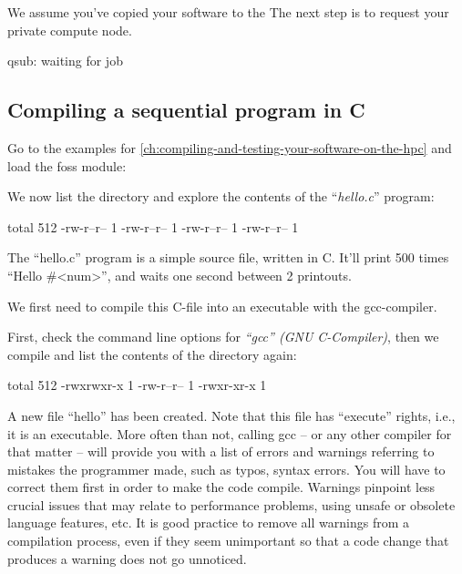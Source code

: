 We assume you've copied your software to the \hpc The next step is to request your private compute node.

\begin{prompt}
qsub: waiting for job %
\end{prompt}

\subsection{Compiling a sequential program in C}

Go to the examples for
\autoref{ch:compiling-and-testing-your-software-on-the-hpc} and load the foss
module:

\begin{prompt}
\end{prompt}

We now list the directory and explore the contents of the ``\emph{hello.c}''
program:

\begin{prompt}
total 512
-rw-r--r-- 1 %
-rw-r--r-- 1 %
-rw-r--r-- 1 %
-rw-r--r-- 1 %
\end{prompt}


The ``hello.c'' program is a simple source file, written in C. It'll print 500
times ``Hello \#<{}num>{}'', and waits one second between 2 printouts.

We first need to compile this C-file into an executable with the gcc-compiler.

First, check the command line options for \emph{``gcc'' (GNU C-Compiler)},
then we compile and list the contents of the directory again:

\begin{prompt}
total 512
-rwxrwxr-x 1 %
-rw-r--r-- 1 %
-rwxr-xr-x 1 %
\end{prompt}

A new file ``hello'' has been created. Note that this file has ``execute''
rights, i.e., it is an executable. More often than not, calling gcc -- or any
other compiler for that matter -- will provide you with a list of errors and
warnings referring to mistakes the programmer made, such as typos, syntax
errors. You will have to correct them first in order to make the code compile.
Warnings pinpoint less crucial issues that may relate to performance problems,
using unsafe or obsolete language features, etc. It is good practice to remove
all warnings from a compilation process, even if they seem unimportant so that
a code change that produces a warning does not go unnoticed.

